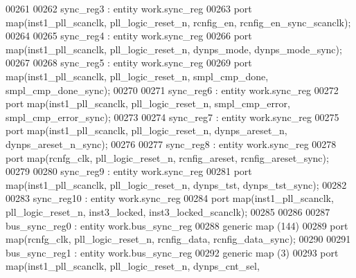 \begin{DoxyCode}
00261  
00262  sync\_reg3 : \textcolor{keywordflow}{entity} work.sync_reg 
00263  \textcolor{keywordflow}{port} \textcolor{keywordflow}{map}(inst1_pll_scanclk, pll_logic_reset_n, rcnfig_en, 
      rcnfig_en_sync_scanclk\textcolor{vhdlchar}{)};
00264  
00265  sync\_reg4 : \textcolor{keywordflow}{entity} work.sync_reg 
00266  \textcolor{keywordflow}{port} \textcolor{keywordflow}{map}(inst1_pll_scanclk, pll_logic_reset_n, dynps_mode, dynps_mode_sync\textcolor{vhdlchar}{)};
00267  
00268  sync\_reg5 : \textcolor{keywordflow}{entity} work.sync_reg 
00269  \textcolor{keywordflow}{port} \textcolor{keywordflow}{map}(inst1_pll_scanclk, pll_logic_reset_n, smpl_cmp_done, 
      smpl_cmp_done_sync\textcolor{vhdlchar}{)};
00270 
00271  sync\_reg6 : \textcolor{keywordflow}{entity} work.sync_reg 
00272  \textcolor{keywordflow}{port} \textcolor{keywordflow}{map}(inst1_pll_scanclk, pll_logic_reset_n, smpl_cmp_error, 
      smpl_cmp_error_sync\textcolor{vhdlchar}{)};
00273  
00274  sync\_reg7 : \textcolor{keywordflow}{entity} work.sync_reg 
00275  \textcolor{keywordflow}{port} \textcolor{keywordflow}{map}(inst1_pll_scanclk, pll_logic_reset_n, dynps_areset_n, 
      dynps_areset_n_sync\textcolor{vhdlchar}{)};
00276  
00277  sync\_reg8 : \textcolor{keywordflow}{entity} work.sync_reg 
00278  \textcolor{keywordflow}{port} \textcolor{keywordflow}{map}(rcnfg_clk, pll_logic_reset_n, rcnfig_areset, rcnfig_areset_sync\textcolor{vhdlchar}{)};
00279  
00280  sync\_reg9 : \textcolor{keywordflow}{entity} work.sync_reg 
00281  \textcolor{keywordflow}{port} \textcolor{keywordflow}{map}(inst1_pll_scanclk, pll_logic_reset_n, dynps_tst, dynps_tst_sync\textcolor{vhdlchar}{)};
00282  
00283  sync\_reg10 : \textcolor{keywordflow}{entity} work.sync_reg 
00284  \textcolor{keywordflow}{port} \textcolor{keywordflow}{map}(inst1_pll_scanclk, pll_logic_reset_n, inst3_locked, 
      inst3_locked_scanclk\textcolor{vhdlchar}{)};
00285  
00286    
00287  bus\_sync\_reg0 : \textcolor{keywordflow}{entity} work.bus_sync_reg
00288  \textcolor{keywordflow}{generic} \textcolor{keywordflow}{map} (\textcolor{vhdllogic}{144}\textcolor{vhdlchar}{)} 
00289  \textcolor{keywordflow}{port} \textcolor{keywordflow}{map}(rcnfg_clk, pll_logic_reset_n, rcnfig_data, rcnfig_data_sync\textcolor{vhdlchar}{)};
00290  
00291  bus\_sync\_reg1 : \textcolor{keywordflow}{entity} work.bus_sync_reg
00292  \textcolor{keywordflow}{generic} \textcolor{keywordflow}{map} (\textcolor{vhdllogic}{3}\textcolor{vhdlchar}{)} 
00293  \textcolor{keywordflow}{port} \textcolor{keywordflow}{map}(inst1_pll_scanclk, pll_logic_reset_n, dynps_cnt_sel, 

\end{DoxyCode}
